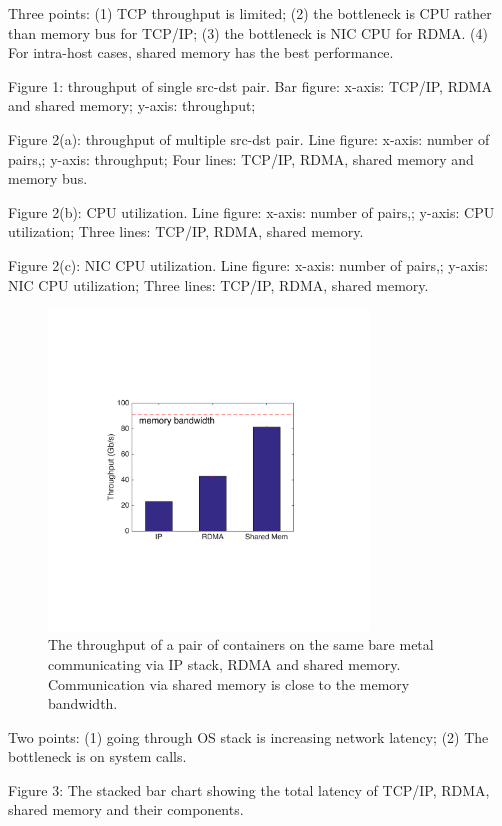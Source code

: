 Three points: (1) TCP throughput is limited; (2) the bottleneck is CPU rather than memory bus for TCP/IP; (3) the bottleneck is NIC CPU for RDMA. (4) For intra-host cases, shared memory has the best performance.

Figure 1: throughput of single src-dst pair. Bar figure: x-axis: TCP/IP, RDMA and shared memory; y-axis: throughput;

Figure 2(a): throughput of multiple src-dst pair. Line figure: x-axis: number of pairs,; y-axis: throughput; Four lines: TCP/IP, RDMA, shared memory and memory bus.

Figure 2(b): CPU utilization. Line figure: x-axis: number of pairs,; y-axis: CPU utilization; Three lines: TCP/IP, RDMA, shared memory.

Figure 2(c): NIC CPU utilization. Line figure: x-axis: number of pairs,; y-axis: NIC CPU utilization; Three lines: TCP/IP, RDMA, shared memory.

\begin{figure}[!ht]
     \centering 
     \includegraphics[width=3.35in]{figures/motivation/eval_baremetal_thr.pdf} 
     \caption{\label{fig:eval_baremetal_thr} The throughput of a pair of containers on the same bare metal communicating via IP stack, RDMA and shared memory. Communication via shared memory is close to the memory bandwidth.} 
\end{figure} 

Two points: (1) going through OS stack is increasing network latency; (2) The bottleneck is on system calls.

Figure 3: The stacked bar chart showing the total latency of TCP/IP, RDMA, shared memory and their components.

